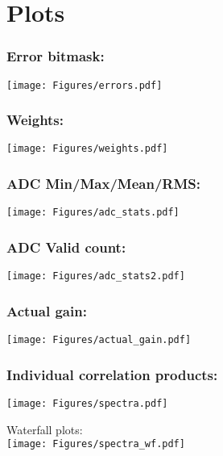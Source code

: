 \section{Plots}

\subsubsection*{Error bitmask:}
\texttt{[image: Figures/errors.pdf]}

\subsubsection*{Weights:}
\texttt{[image: Figures/weights.pdf]}

\subsubsection*{ADC Min/Max/Mean/RMS:}
\texttt{[image: Figures/adc\_stats.pdf]}

\subsubsection*{ADC Valid count:}
\texttt{[image: Figures/adc\_stats2.pdf]}

\subsubsection*{Actual gain:}
\texttt{[image: Figures/actual\_gain.pdf]}


\subsubsection*{Individual correlation products:}
\texttt{[image: Figures/spectra.pdf]}

\newpage
Waterfall plots:\\
\texttt{[image: Figures/spectra\_wf.pdf]}


